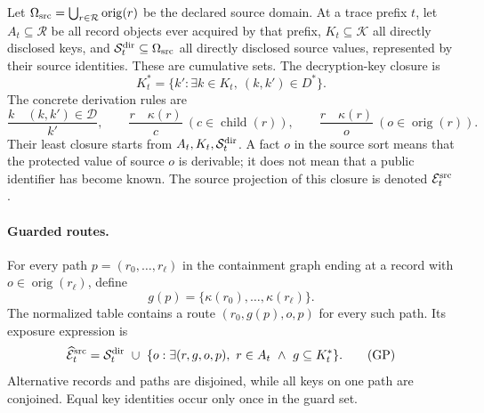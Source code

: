 Let $\Omega_{\rm src}=\bigcup_{r\in\mathcal R}\operatorname{orig}(r)$ be the
declared source domain.  At a trace prefix $t$, let $A_t\subseteq\mathcal R$ be all record objects
ever acquired by that prefix, $K_t\subseteq\mathcal K$ all directly
disclosed keys, and $\mathcal S^{\rm dir}_t\subseteq\Omega_{\rm src}$ all directly disclosed source values, represented
by their source identities.  These are cumulative sets.  The decryption-key
closure is
\[
  K_t^*=\{k':\exists k\in K_t,\ (k,k')\in D^*\}.
\]
The concrete derivation rules are
\[
 \frac{k\quad(k,k')\in\mathcal D}{k'},\qquad
 \frac{r\quad\kappa(r)}{c}\ (c\in\operatorname{child}(r)),\qquad
 \frac{r\quad\kappa(r)}{o}\ (o\in\operatorname{orig}(r)).
\]
Their least closure starts from $A_t,K_t,\mathcal S^{\rm dir}_t$.  A fact $o$ in the source
sort means that the protected value of source $o$ is derivable; it does
not mean that a public identifier has become known.  The source projection
of this closure is denoted $\mathcal E^{\rm src}_t$.

\paragraph{Guarded routes.}
For every path $p=(r_0,\ldots,r_\ell)$ in the containment graph ending
at a record with $o\in\operatorname{orig}(r_\ell)$, define
\[
 g(p)=\{\kappa(r_0),\ldots,\kappa(r_\ell)\}.
\]
The normalized table contains a route $(r_0,g(p),o,p)$ for every such
path.  Its exposure expression is
\[
 \widehat{\mathcal E}^{\rm src}_t=\mathcal S^{\rm dir}_t\ \cup\
 \{o:\exists(r,g,o,p),\ r\in A_t\ \land\ g\subseteq K_t^*\}.
 \tag{GP}
\]
Alternative records and paths are disjoined, while all keys on one path
are conjoined.  Equal key identities occur only once in the guard set.

